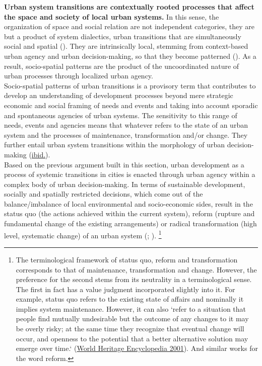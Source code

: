 \documentclass[11pt]{report}
\begin{document}
{{\textbf{Urban system transitions are contextually rooted processes that affect the space and society of local urban systems.}
In this sense, the organization of space and social relation are not independent categories, they are but a product of system dialectics, urban transitions that are simultaneously social and spatial (\href{Soja}{\citealt{soja_socio-spatial_1980}}). They are intrinsically local, stemming from context-based urban agency and urban decision-making, so that they become patterned (\href{Gottdiener}{\citealt{gottdiener_social_2010}}).
As a result, socio-spatial patterns are the product of the uncoordinated nature of urban processes through localized urban agency.
\\

Socio-spatial patterns of urban transitions is a provisory term  that contributes to develop an understanding of development processes beyond mere strategic economic and social framing of needs and events and taking into account sporadic and spontaneous agencies of urban systems. The sensitivity to this range of needs, events and agencies means that whatever refers to the state of an urban system and the processes of maintenance, transformation and/or change. They further entail urban system transitions within the morphology of urban decision-making (\href{Gottdiener}{ibid.}).
\\

Based on the previous argument built in this section, urban development as a process of systemic transitions in cities is enacted through urban agency within a complex body of urban decision-making.
In terms of sustainable development, socially and spatially restricted decisions, which come out of the balance/imbalance of local environmental and socio-economic sides, result in the status quo (the actions achieved within the current system), reform (rupture and fundamental change of the existing arrangements) or radical transformation (high level, systematic change) of an urban system 
(\href{Rees}{\citealt{hamm_understanding_2001}}; \href{Hopwood}{\citealt{hopwood_sustainable_2005}}).
\footnote{
The terminological framework of status quo, reform and transformation corresponds to that of maintenance, transformation and change.
However, the preference for the second stems from its neutrality in a terminological sense.
The first in fact has a value judgment incorporated slightly into it. For example, status quo refers to the existing state of affairs and nominally it implies system maintenance. However, it can also `refer to a situation that people find mutually undesirable but the outcome of any changes to it may be overly risky; at the same time they recognize that eventual change will occur, and openness to the potential that a better alternative solution may emerge over time.` (\href{WorldHeritageEncyclopedia}{World Heritage Encyclopedia 2001}). And similar works for the word reform.}
\\

}}
\end{document}
